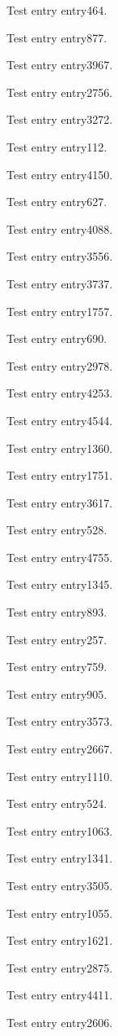 Test entry \gls{entry464}.

Test entry \gls{entry877}.

Test entry \gls{entry3967}.

Test entry \gls{entry2756}.

Test entry \gls{entry3272}.

Test entry \gls{entry112}.

Test entry \gls{entry4150}.

Test entry \gls{entry627}.

Test entry \gls{entry4088}.

Test entry \gls{entry3556}.

Test entry \gls{entry3737}.

Test entry \gls{entry1757}.

Test entry \gls{entry690}.

Test entry \gls{entry2978}.

Test entry \gls{entry4253}.

Test entry \gls{entry4544}.

Test entry \gls{entry1360}.

Test entry \gls{entry1751}.

Test entry \gls{entry3617}.

Test entry \gls{entry528}.

Test entry \gls{entry4755}.

Test entry \gls{entry1345}.

Test entry \gls{entry893}.

Test entry \gls{entry257}.

Test entry \gls{entry759}.

Test entry \gls{entry905}.

Test entry \gls{entry3573}.

Test entry \gls{entry2667}.

Test entry \gls{entry1110}.

Test entry \gls{entry524}.

Test entry \gls{entry1063}.

Test entry \gls{entry1341}.

Test entry \gls{entry3505}.

Test entry \gls{entry1055}.

Test entry \gls{entry1621}.

Test entry \gls{entry2875}.

Test entry \gls{entry4411}.

Test entry \gls{entry2606}.

